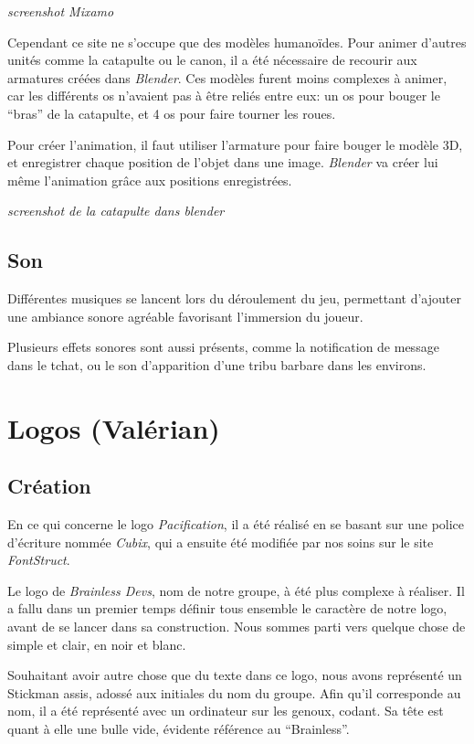 \documentclass[12pt]{report}
\begin{document}
\textit{screenshot Mixamo}

Cependant ce site ne s’occupe que des modèles humanoïdes. Pour animer d’autres unités comme 
la catapulte ou le canon, il a été nécessaire de recourir aux armatures créées dans \textit{Blender}. 
Ces modèles furent moins complexes à animer, car les différents os n’avaient pas à être reliés entre 
eux: un os pour bouger le “bras” de la catapulte, et 4 os pour faire tourner les roues.

Pour créer l’animation, il faut utiliser l’armature pour faire bouger le modèle 3D, et enregistrer chaque 
position de l’objet dans une image. \textit{Blender} va créer lui même l’animation grâce aux positions 
enregistrées.

\textit{screenshot de la catapulte dans blender}

\subsection{Son}

Différentes musiques se lancent lors du déroulement du jeu, permettant d’ajouter une 
ambiance sonore agréable favorisant l’immersion du joueur.

Plusieurs effets sonores sont aussi présents, comme la notification de message dans le 
tchat, ou le son d’apparition d’une tribu barbare dans les environs.

\section{Logos (Valérian)}

\subsection{Création}

En ce qui concerne le logo \textit{Pacification}, il a été réalisé en se basant sur une 
police d’écriture nommée \textit{Cubix}, qui a ensuite été modifiée par nos soins sur 
le site \textit{FontStruct}.

Le logo de \textit{Brainless Devs}, nom de notre groupe, à été plus complexe à réaliser.
Il a fallu dans un premier temps définir tous ensemble le caractère de notre logo, 
avant de se lancer dans sa construction. Nous sommes parti vers quelque chose 
de simple et clair, en noir et blanc.

Souhaitant avoir autre chose que du texte dans ce logo, nous avons représenté un
Stickman assis, adossé aux initiales du nom du groupe. Afin qu’il corresponde au
nom, il a été représenté avec un ordinateur sur les genoux, codant. Sa tête est
quant à elle une bulle vide, évidente référence au “Brainless”.
\end{document}
